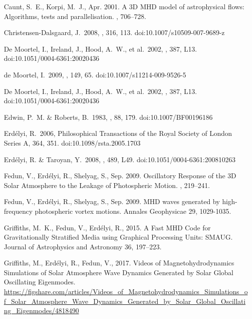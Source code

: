 \documentclass[linenumbers]{aastex63}
\begin{document}
\begin{thebibliography}{}
{Caunt}, S.~E., {Korpi}, M.~J., Apr. 2001. A {3D} {MHD} model of astrophysical
  flows: Algorithms, tests and parallelisation. , 706--728.

 Christensen-Dalsgaard, J.\ 2008, \apss, 316, 113. doi:10.1007/s10509-007-9689-z

 De Moortel, I., Ireland, J., Hood, A.~W., et al.\ 2002, \aap, 387, L13. doi:10.1051/0004-6361:20020436


 de Moortel, I.\ 2009, \ssr, 149, 65. doi:10.1007/s11214-009-9526-5

 De Moortel, I., Ireland, J., Hood, A.~W., et al.\ 2002, \aap, 387, L13. doi:10.1051/0004-6361:20020436

 Edwin, P.~M. \& Roberts, B.\ 1983, \solphys, 88, 179. doi:10.1007/BF00196186

 Erd{\'e}lyi, R.\ 2006, Philosophical Transactions of the Royal Society of London Series A, 364, 351. doi:10.1098/rsta.2005.1703

 Erd{\'e}lyi, R. \& Taroyan, Y.\ 2008, \aap, 489, L49. doi:10.1051/0004-6361:200810263

{Fedun}, V., {Erd{\'e}lyi}, R., {Shelyag}, S., Sep. 2009. {Oscillatory Response
  of the 3D Solar Atmosphere to the Leakage of Photospheric Motion}. , 219--241.

{Fedun}, V., {Erd{\'e}lyi}, R., {Shelyag}, S., Sep. 2009. {MHD waves generated by high-frequency photospheric vortex motions}. Annales Geophysicae
  29, 1029-1035.

{Griffiths}, M.~K., {Fedun}, V., {Erd{\'e}lyi}, R., 2015. {A Fast MHD Code for
  Gravitationally Stratified Media using Graphical Processing Units: SMAUG}.
  Journal of Astrophysics and Astronomy 36, 197--223.

{Griffiths}, M., {Erd{\'e}lyi}, R., {Fedun}, V., 2017. {Videos of
  Magnetohydrodynamics Simulations of Solar Atmosphere Wave Dynamics Generated
  by Solar Global Oscillating Eigenmodes}.
\newline \url{https://figshare.com/articles/Videos_of_Magnetohydrodynamics_Simulations_of_Solar_Atmosphere_Wave_Dynamics_Generated_by_Solar_Global_Oscillating_Eigenmodes/4818490}


\end{thebibliography}
\end{document}
